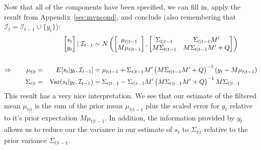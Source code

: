 \documentclass[a4paper,12pt]{article}
\begin{document}
Now that all of the components have been specified, we can fill in,
apply the result from Appendix~\ref{sec:mvncond}, and conclude (also
remembering that $\mathcal{I}_{t}=\mathcal{I}_{t-1} \cup \{y_t\}$):
\begin{alignat}{3}
  &&\begin{bmatrix} s_t \\ y_t \end{bmatrix} | \; 
  \mathcal{I}_{t-1}
  &\sim 
  N\left(\begin{bmatrix} \mu_{t|t-1} \\ M\mu_{t|t-1} 
    \end{bmatrix},
  \begin{bmatrix} 
    \Sigma_{t|t-1} & \Sigma_{t|t-1} M'
    \notag\\
    M\Sigma_{t|t-1} & M\Sigma_{t|t-1}M' + Q 
  \end{bmatrix} 
  \right) \notag\\\label{normfilt}\\
  \Rightarrow \qquad
  \mu_{t|t} =&& E[s_t|y_t, \mathcal{I}_{t-1}]
    &= \mu_{t|t-1} + \Sigma_{t|t-1} M' 
    \left(M\Sigma_{t|t-1}M' + Q\right)^{-1} (y_t-M\mu_{t|t-1}) \notag\\
  \Sigma_{t|t} =&& 
    \text{Var}(s_t|y_t, \mathcal{I}_{t-1})
    &= \Sigma_{t|t-1} - \Sigma_{t|t-1}M' 
    \left(M\Sigma_{t|t-1}M' + Q\right)^{-1} M\Sigma_{t|t-1} \notag
\end{alignat}
This result has a very nice interpretation. We see that our estimate of
the filtered mean $\mu_{t|t}$ is the sum of the prior mean $\mu_{t|t-1}$
plus the scaled error for $y_t$ relative to it's prior expectation
$M\mu_{t|t-1}$.  In addition, the information provided by $y_t$ allows
us to reduce our the variance in our estimate of $s_t$ to $\Sigma_{t|t}$
relative to the prior variance $\Sigma_{t|t-1}$.
\end{document}
